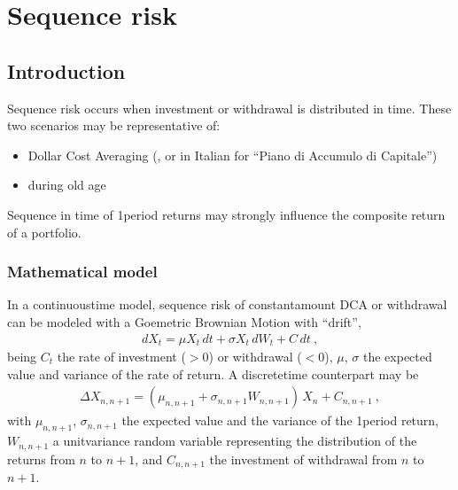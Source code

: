 \documentclass[letterpaper,10pt,english]{jupyterBook}
\begin{document}
\chapter{Sequence risk}
\label{\detokenize{code/notebooks/sequence-risk:sequence-risk}}\label{\detokenize{code/notebooks/sequence-risk::doc}}

\section{Introduction}
\label{\detokenize{code/notebooks/sequence-risk:introduction}}
\sphinxAtStartPar
Sequence risk occurs when investment or withdrawal is distributed in time. These two scenarios may be representative of:
\begin{itemize}
\item {} 
\sphinxAtStartPar
Dollar Cost Averaging (, or  in Italian for “Piano di Accumulo di Capitale”)

\item {} 
\sphinxAtStartPar
{} during old age

\end{itemize}

\sphinxAtStartPar
Sequence in time of 1\sphinxhyphen{}period returns may strongly influence the composite return of a portfolio.


\subsection{Mathematical model}
\label{\detokenize{code/notebooks/sequence-risk:mathematical-model}}
\sphinxAtStartPar
In a continuous\sphinxhyphen{}time model, sequence risk of constant\sphinxhyphen{}amount DCA or withdrawal can be modeled with a Goemetric Brownian Motion with “drift”,
\begin{equation*}
\begin{split}d X_t = \mu X_t \, dt + \sigma X_t \, dW_t + C \, dt  \ ,\end{split}
\end{equation*}
\sphinxAtStartPar
being \(C_t\) the rate of investment (\(> 0\)) or withdrawal (\(< 0\)), \(\mu\), \(\sigma\) the expected value and variance of the rate of return. A discrete\sphinxhyphen{}time counterpart may be
\begin{equation*}
\begin{split}\Delta X_ {n,n+1} = \left( \mu_{n,n+1} + \sigma_{n,n+1} W_{n,n+1} \right) \, X_n + C_{n,n+1} \ , \end{split}
\end{equation*}
\sphinxAtStartPar
with \(\mu_{n,n+1}\), \(\sigma_{n,n+1}\) the expected value and the variance of the 1\sphinxhyphen{}period return, \(W_{n,n+1}\) a unit\sphinxhyphen{}variance random variable representing the distribution of the returns from \(n\) to \(n+1\), and \(C_{n,n+1}\) the investment of withdrawal from \(n\) to \(n+1\).
\end{document}
